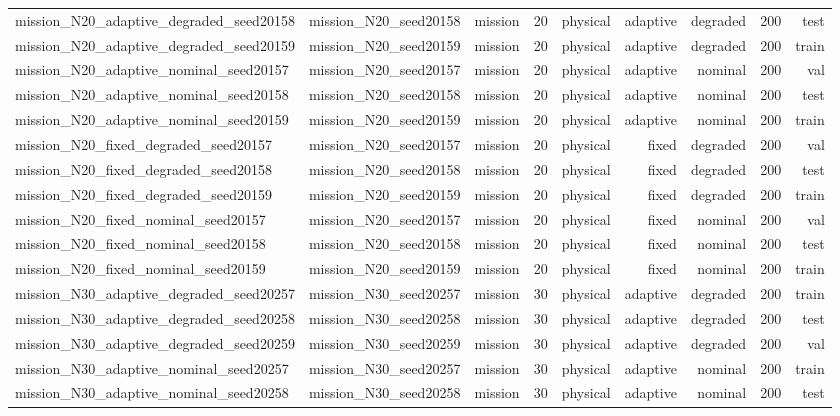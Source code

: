 \begin{tabular}{lrrrrrrrr}
mission\_N20\_adaptive\_degraded\_seed20158 & mission\_N20\_seed20158 & mission & 20 & physical & adaptive & degraded & 200 & test \\
mission\_N20\_adaptive\_degraded\_seed20159 & mission\_N20\_seed20159 & mission & 20 & physical & adaptive & degraded & 200 & train \\
mission\_N20\_adaptive\_nominal\_seed20157 & mission\_N20\_seed20157 & mission & 20 & physical & adaptive & nominal & 200 & val \\
mission\_N20\_adaptive\_nominal\_seed20158 & mission\_N20\_seed20158 & mission & 20 & physical & adaptive & nominal & 200 & test \\
mission\_N20\_adaptive\_nominal\_seed20159 & mission\_N20\_seed20159 & mission & 20 & physical & adaptive & nominal & 200 & train \\
mission\_N20\_fixed\_degraded\_seed20157 & mission\_N20\_seed20157 & mission & 20 & physical & fixed & degraded & 200 & val \\
mission\_N20\_fixed\_degraded\_seed20158 & mission\_N20\_seed20158 & mission & 20 & physical & fixed & degraded & 200 & test \\
mission\_N20\_fixed\_degraded\_seed20159 & mission\_N20\_seed20159 & mission & 20 & physical & fixed & degraded & 200 & train \\
mission\_N20\_fixed\_nominal\_seed20157 & mission\_N20\_seed20157 & mission & 20 & physical & fixed & nominal & 200 & val \\
mission\_N20\_fixed\_nominal\_seed20158 & mission\_N20\_seed20158 & mission & 20 & physical & fixed & nominal & 200 & test \\
mission\_N20\_fixed\_nominal\_seed20159 & mission\_N20\_seed20159 & mission & 20 & physical & fixed & nominal & 200 & train \\
mission\_N30\_adaptive\_degraded\_seed20257 & mission\_N30\_seed20257 & mission & 30 & physical & adaptive & degraded & 200 & train \\
mission\_N30\_adaptive\_degraded\_seed20258 & mission\_N30\_seed20258 & mission & 30 & physical & adaptive & degraded & 200 & test \\
mission\_N30\_adaptive\_degraded\_seed20259 & mission\_N30\_seed20259 & mission & 30 & physical & adaptive & degraded & 200 & val \\
mission\_N30\_adaptive\_nominal\_seed20257 & mission\_N30\_seed20257 & mission & 30 & physical & adaptive & nominal & 200 & train \\
mission\_N30\_adaptive\_nominal\_seed20258 & mission\_N30\_seed20258 & mission & 30 & physical & adaptive & nominal & 200 & test \\

\end{tabular}
